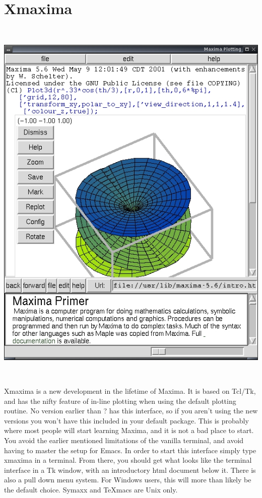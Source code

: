 \section{Xmaxima}
~

{\centering \includegraphics{images/xmaxima} \par}

~

Xmaxima is a new development in the lifetime of Maxima. It is based
on Tcl/Tk, and has the nifty feature of in-line plotting when using
the default plotting routine. No version earlier than ? has this interface,
so if you aren't using the new versions you won't have this included
in your default package. This is probably where most people will start
learning Maxima, and it is not a bad place to start. You avoid the
earlier mentioned limitations of the vanilla terminal, and avoid having
to master the setup for Emacs. In order to start this interface simply
type xmaxima in a terminal. From there, you should get what looks
like the terminal interface in a Tk window, with an introductory html
document below it. There is also a pull down menu system. For Windows
users, this will more than likely be the default choice. Symaxx and
\TeX{}macs are Unix only.

